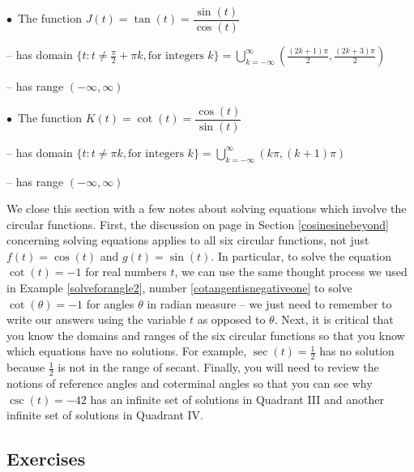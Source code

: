 {\begin{thm}
\hspace{.3in} $\bullet \, $ The function $J(t) = \tan(t) = \dfrac{\sin(t)}{\cos(t)}$

\hspace{.5in} -- has domain $\{ t : t \neq  \frac{\pi}{2} + \pi k, \text{for integers $k$} \}  = \displaystyle{\bigcup_{k = -\infty}^{\infty} \left( \frac{(2k+1)\pi}{2}, \frac{(2k+3) \pi}{2} \right)}$ 

\hspace{.5in} -- has range $(-\infty, \infty)$ 

\medskip

\hspace{.3in} $\bullet \, $ The function $K(t) = \cot(t) = \dfrac{\cos(t)}{\sin(t)}$

\hspace{.5in} -- has domain $\{ t : t \neq \pi k, \text{for integers $k$} \}  = \displaystyle{\bigcup_{k = -\infty}^{\infty} \left(k \pi ,(k+1) \pi \right)}$ 

\hspace{.5in} -- has range $(-\infty, \infty)$ 

\end{thm}

\ebm}

\pagebreak

We close this section with a few notes about solving equations which involve the circular functions.  First, the discussion on page \pageref{cosinesineequationsrealnumbers} in Section \ref{cosinesinebeyond} concerning solving equations applies to all six circular functions, not just $f(t) = \cos(t)$ and $g(t) = \sin(t)$. In particular, to solve the equation $\cot(t) = -1$ for real numbers $t$, we can use the same thought process we used in Example \ref{solveforangle2}, number \ref{cotangentisnegativeone} to solve $\cot(\theta) = -1$ for angles $\theta$ in radian measure --  we just need to remember to write our answers using the variable $t$ as opposed to $\theta$. Next, it is critical that you know the domains and ranges of the six circular functions so that you know which equations have no solutions.  For example, $\sec(t) = \frac{1}{2}$ has no solution because $\frac{1}{2}$ is not in the range of secant. Finally, you will need to review the notions of reference angles and coterminal angles so that you can see why $\csc(t) = -42$ has an infinite set of solutions in Quadrant III and another infinite set of solutions in Quadrant IV.

\newpage

\subsection{Exercises}

